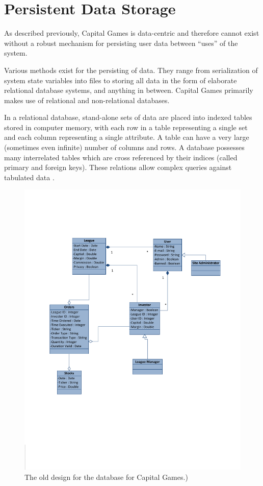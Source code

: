 \section{Persistent Data Storage}

As described previously, Capital Games is data-centric
and therefore cannot exist without a robust mechanism
for persisting user data between ``uses'' of the system.

Various methods exist for the persisting of data. They range
from serialization of system state variables into files
to storing all data in the form of elaborate relational
database systems, and anything in between. Capital Games
primarily makes use of relational and non-relational databases.

In a relational database, stand-alone sets of data are placed
into indexed tables stored in computer memory, with each row in a table
representing a single set and each column representing a single
attribute. A table can have a very large (sometimes even 
infinite) number of columns and rows. A database possesses
many interrelated tables which are cross referenced by their
indices (called primary and foreign keys). These relations
allow complex queries against tabulated data \cite{wiki:rdb}.

\begin{figure}[ht]
\centering
\includegraphics[width=6in]{./img/domainModelold.pdf}
\caption{The old design for the database for Capital Games.)}
\end{figure}

